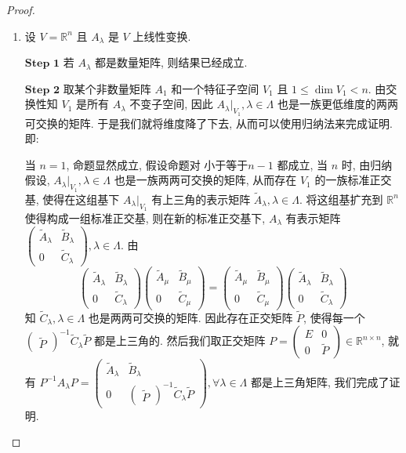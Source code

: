 \documentclass[../../main.tex]{subfiles}%
\begin{document}
\begin{proof}
\begin{enumerate}
\item 设 $V = \mathbb{R}^n$ 且 $A_{\lambda}$ 是 $V$ 上线性变换.

$\mathbf{Step}\,\,\mathbf{1}$ 若 $A_{\lambda}$ 都是数量矩阵, 则结果已经成立.

$\mathbf{Step}\,\,\mathbf{2}$  取某个非数量矩阵 $A_1$ 和一个特征子空间 $V_1$ 且 $1 \leqslant  \dim V_1 < n$. 由交换性知 $V_1$ 是所有 $A_{\lambda}$ 不变子空间, 因此 $A_{\lambda}|_{V_1}, \lambda \in \Lambda$ 也是一族更低维度的两两可交换的矩阵. 于是我们就将维度降了下去, 从而可以使用归纳法来完成证明. 即:

当 $n = 1$, 命题显然成立, 假设命题对 小于等于$n - 1$ 都成立, 当 $n$ 时, 由归纳假设, $A_{\lambda}|_{V_1}, \lambda \in \Lambda$ 也是一族两两可交换的矩阵, 从而存在 $V_1$ 的一族标准正交基, 使得在这组基下 $A_{\lambda}|_{V_1}$ 有上三角的表示矩阵 $\widetilde{A}_{\lambda}, \lambda \in \Lambda$. 将这组基扩充到 $\mathbb{R}^n$ 使得构成一组标准正交基, 则在新的标准正交基下, $A_{\lambda}$ 有表示矩阵 $\begin{pmatrix} \widetilde{A}_{\lambda} & \widetilde{B}_{\lambda} \\ 0 & \widetilde{C}_{\lambda} \end{pmatrix}, \lambda \in \Lambda$. 由
\[
\begin{pmatrix} \widetilde{A}_{\lambda} & \widetilde{B}_{\lambda} \\ 0 & \widetilde{C}_{\lambda} \end{pmatrix} \begin{pmatrix} \widetilde{A}_{\mu} & \widetilde{B}_{\mu} \\ 0 & \widetilde{C}_{\mu} \end{pmatrix} = \begin{pmatrix} \widetilde{A}_{\mu} & \widetilde{B}_{\mu} \\ 0 & \widetilde{C}_{\mu} \end{pmatrix} \begin{pmatrix} \widetilde{A}_{\lambda} & \widetilde{B}_{\lambda} \\ 0 & \widetilde{C}_{\lambda} \end{pmatrix}
\]
知 $\widetilde{C}_{\lambda}, \lambda \in \Lambda$ 也是两两可交换的矩阵. 因此存在正交矩阵 $\widetilde{P}$, 使得每一个 $\begin{pmatrix} \widetilde{P} \end{pmatrix}^{-1} \widetilde{C}_{\lambda} \widetilde{P}$ 都是上三角的. 然后我们取正交矩阵 $P = \begin{pmatrix} E & 0 \\ 0 & \widetilde{P} \end{pmatrix} \in \mathbb{R}^{n \times n}$, 就有 $P^{-1}A_{\lambda}P = \begin{pmatrix} \widetilde{A}_{\lambda} & \widetilde{B}_{\lambda} \\ 0 & \begin{pmatrix} \widetilde{P} \end{pmatrix}^{-1} \widetilde{C}_{\lambda} \widetilde{P} \end{pmatrix}, \forall \lambda \in \Lambda$ 都是上三角矩阵, 我们完成了证明.
\end{enumerate}

\end{proof}
\end{document}
